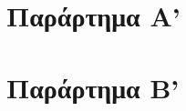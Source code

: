 \documentclass[a4paper,11pt,twoside]{book}
\begin{document}
\backmatter
 

% 
\clearemptydoublepage

\chapter{Παράρτημα Α'}\label{ch:appendixA}

\clearemptydoublepage

\chapter{Παράρτημα Β'}\label{ch:appendixB}

\clearemptydoublepage


\end{document}
